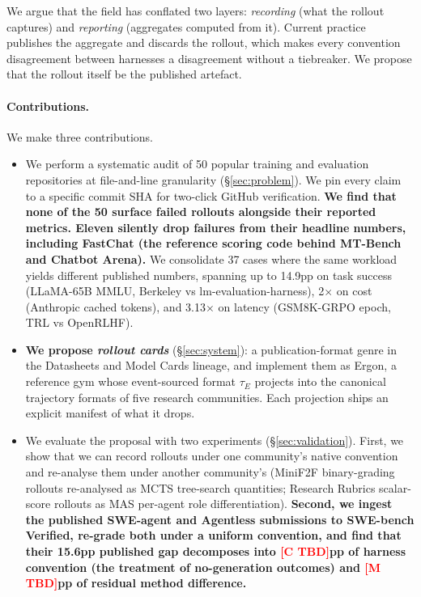 \documentclass{article}
\newcommand{\expnum}[1]{\textcolor{red}{\textbf{[#1]}}}
\begin{document}
We argue that the field has conflated two layers:
\emph{recording} (what the rollout captures) and
\emph{reporting} (aggregates computed from it). Current practice
publishes the aggregate and discards the rollout, which makes
every convention disagreement between harnesses a disagreement
without a tiebreaker. We propose that the rollout itself be
the published artefact.

\paragraph{Contributions.} We make three contributions.

\begin{itemize}\itemsep 2pt
  \item We perform a systematic audit of 50 popular training
    and evaluation repositories at file-and-line granularity
    (\S\ref{sec:problem}). We pin every claim to a specific
    commit SHA for two-click GitHub verification.
    \textbf{We find that none of the 50 surface failed rollouts
    alongside their reported metrics. Eleven silently drop
    failures from their headline numbers, including FastChat
    (the reference scoring code behind MT-Bench and Chatbot
    Arena).} We consolidate 37 cases where the same workload
    yields different published numbers, spanning up to 14.9pp
    on task success (LLaMA-65B MMLU, Berkeley vs
    lm-evaluation-harness), 2$\times$ on cost (Anthropic cached
    tokens), and 3.13$\times$ on latency (GSM8K-GRPO epoch,
    TRL vs OpenRLHF).
  \item \textbf{We propose \emph{rollout cards}}
    (\S\ref{sec:system}): a publication-format genre in the
    Datasheets \citep{gebru2021datasheets} and Model Cards
    \citep{mitchell2019modelcards} lineage, and implement them
    as Ergon, a reference gym whose event-sourced format
    $\tau_E$ projects into the canonical trajectory formats of
    five research communities. Each projection ships an
    explicit manifest of what it drops.
  \item We evaluate the proposal with two experiments
    (\S\ref{sec:validation}). First, we show that we can record
    rollouts under one community's native convention and
    re-analyse them under another community's (MiniF2F
    binary-grading rollouts re-analysed as MCTS tree-search
    quantities; Research Rubrics scalar-score rollouts as MAS
    per-agent role differentiation). \textbf{Second, we ingest
    the published SWE-agent and Agentless submissions to
    SWE-bench Verified, re-grade both under a uniform
    convention, and find that their 15.6pp published gap
    decomposes into \expnum{C TBD}pp of harness convention
    (the treatment of no-generation outcomes) and
    \expnum{M TBD}pp of residual method difference.}
\end{itemize}
\end{document}
